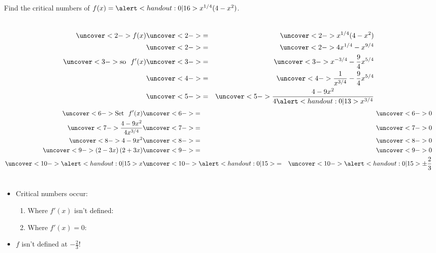 \begin{frame}
\begin{example}
Find the critical numbers of $f(x) = \alert<handout:0| 16>{x^{1/4}}(4-x^2)$.
\begin{columns}[c]
\begin{eqnarray*}
\uncover<2->{%
f(x)%
}%
& \uncover<2->{ = } &%
\uncover<2->{%
x^{1/4}(4-x^2)%
}\\%
& \uncover<2->{ = } &%
\uncover<2->{%
 4x^{1/4} - x^{9/4}%
}\\%
\uncover<3->{%
\textrm{so}\ \ f'(x) %
}%
& \uncover<3->{ = } &%
\uncover<3->{%
x^{-3/4} - \frac{9}{4} x^{5/4}%
}\\%
& \uncover<4->{ = } &%
\uncover<4->{%
\frac{1}{x^{3/4}} - \frac{9}{4} x^{5/4}%
}\\%
& \uncover<5->{ = } &%
\uncover<5->{%
\frac{4-9 x^2}{4\alert<handout:0| 13>{x^{3/4}}}%
}%
\end{eqnarray*}
\begin{eqnarray*}
\uncover<6->{\textrm{Set}\ \ f'(x)}%
& \uncover<6->{ = } &%
\uncover<6->{0}\\%
\uncover<7->{%
\frac{4-9 x^2}{4x^{3/4}}%
}%
& \uncover<7->{ = } &%
\uncover<7->{%
0 %
}\\%
\uncover<8->{%
4-9 x^2%
}%
& \uncover<8->{ = } &%
\uncover<8->{%
0 %
}\\%
\uncover<9->{%
\left( 2- 3x\right) \left( 2 + 3 x\right) %
}%
& \uncover<9->{ = } &%
\uncover<9->{%
0 %
}\\%
\uncover<10->{%
\alert<handout:0| 15>{x} %
}%
& \uncover<10->{ \alert<handout:0| 15>{=} } &%
\uncover<10->{%
\alert<handout:0| 15>{\pm \frac{2}{3}} %
}%
\end{eqnarray*}
\end{columns}
\begin{itemize}
\item<11->  Critical numbers occur:
\begin{enumerate}
\item<11-| alert@12-13>  Where $f'(x)$ isn't defined: 
\item<11-| alert@14-15>  Where $f'(x) = 0$: 
\end{enumerate}
\item<16-| alert@16>  $f$ isn't defined at $-\frac{2}{3}$!  
\end{itemize}
\end{example}
\end{frame}
